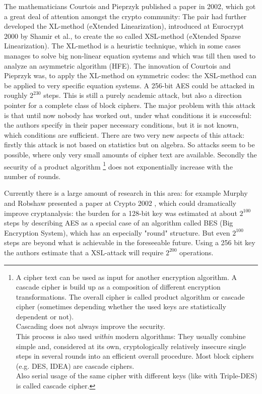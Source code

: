 The mathematicians Courtois and Pieprzyk \cite{cm:Courtois2002} published a paper
in 2002, which got a great deal of attention amongst the crypto community: The
pair had further developed the XL-method (eXtended Linearization), introduced at
Eurocrypt 2000 by Shamir et al., to create the so called XSL-method (eXtended
Sparse Linearization). The XL-method is a heuristic technique, which in some
cases manages to solve big non-linear equation systems and which was till then
used to analyze an asymmetric algorithm (HFE).  The innovation of Courtois and
Pieprzyk was, to apply the XL-method on symmetric codes: the XSL-method can be
applied to very specific equation systems. A 256-bit AES could be attacked in
roughly $2^{230}$ steps. This is still a purely academic attack, but also a
direction pointer for a complete class of block ciphers. The major problem with
this attack is that until now nobody has worked out, under what conditions it is
successful: the authors specify in their paper necessary conditions, but it is
not known, which conditions are sufficient.  There are two very new aspects of
this attack: firstly this attack is not based on statistics but on algebra. So
attacks seem to be possible, where only very small amounts of cipher text are
available. Secondly the security of a product algorithm%
\footnote{%
A cipher text can be used as input for another encryption algorithm. 
A cascade cipher is build up as a composition of different encryption 
transformations. The overall cipher is called product algorithm or cascade cipher (sometimes depending whether the used keys are statistically dependent or not).\\
Cascading does not always improve the security.\\
This process is also used {\em within} modern algorithms:
They usually combine simple and, considered at its own, cryptologically
relatively insecure single steps in several rounds into an efficient 
overall procedure.  Most block ciphers (e.g. DES, IDEA) are cascade ciphers.\\
Also serial usage of the same cipher with different keys (like with Triple-DES)
is called cascade cipher. 
}
does not exponentially increase with the number of rounds.

Currently there is a large amount of research in this area: for example Murphy and Robshaw presented a paper at Crypto 2002 \cite{cm:Robshaw2002a}, which could dramatically improve cryptanalysis: the burden for a 128-bit key was estimated at about $2^{100}$ steps by describing AES as a special case of an algorithm called BES (Big Encryption System), which has an especially "round" structure. But even $2^{100}$ steps are beyond what is achievable in the foreseeable future. Using a 256 bit key the authors estimate that a XSL-attack will require $2^{200}$ operations.


